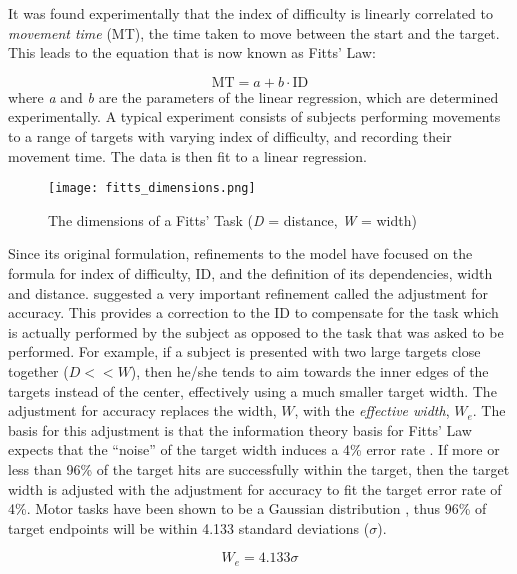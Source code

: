 It was found experimentally that the index of difficulty is linearly correlated to \emph{movement time} (MT), the time taken to move between the start and the target.
This leads to the equation that is now known as Fitts' Law:

\begin{equation}
    \mathrm{MT} = a + b \cdot \mathrm{ID}
\end{equation}
where \emph{a} and \emph{b} are the parameters of the linear regression, which are determined experimentally.
A typical experiment consists of subjects performing movements to a range of targets with varying index of difficulty, and recording their movement time.
The data is then fit to a linear regression.

\begin{figure}
    \centering
    \texttt{[image: fitts\_dimensions.png]}
    \caption{The dimensions of a Fitts' Task (\emph{D} = distance, \emph{W} = width)}
    \label{fig:intro_fitts}
\end{figure}

Since its original formulation, refinements to the model have focused on the formula for index of difficulty, \(\text{ID}\), and the definition of its dependencies, width and distance.
\citet{crossman_speed_1957} suggested a very important refinement called the adjustment for accuracy.
This provides a correction to the \(\text{ID}\) to compensate for the task which is actually performed by the subject as opposed to the task that was asked to be performed.
For example, if a subject is presented with two large targets close together ($D << W$), then he/she tends to aim towards the inner edges of the targets instead of the center, effectively using a much smaller target width.
The adjustment for accuracy replaces the width, \(W\), with the \emph{effective width}, \(W_{e}\).
The basis for this adjustment is that the information theory basis for Fitts' Law expects that the ``noise'' of the target width induces a 4\% error rate \citep{mackenzie_fitts_1992}.
If more or less than 96\% of the target hits are successfully within the target, then the target width is adjusted with the adjustment for accuracy to fit the target error rate of 4\%.
Motor tasks have been shown to be a Gaussian distribution \citep{crossman_feedback_1983,woodworth_accuracy_1899}, thus 96\% of target endpoints will be within 4.133 standard deviations (\(\sigma\)).

\begin{equation}
W_{e} = 4.133\sigma
\end{equation}

